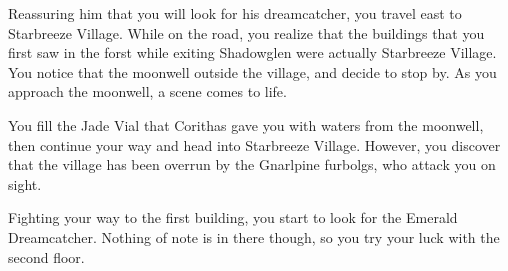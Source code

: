 



Reassuring him that you will look for his dreamcatcher, you travel east to Starbreeze Village. While on the road, you realize that the buildings that you first saw in the forst while exiting Shadowglen were actually Starbreeze Village. You notice that the moonwell outside the village, and decide to stop by. As you approach the moonwell, a scene comes to life.


You fill the Jade Vial that Corithas gave you with waters from the moonwell, then continue your way and head into Starbreeze Village. However, you discover that the village has been overrun by the Gnarlpine furbolgs, who attack you on sight.

Fighting your way to the first building, you start to look for the Emerald Dreamcatcher. Nothing of note is in there though, so you try your luck with the second floor.

